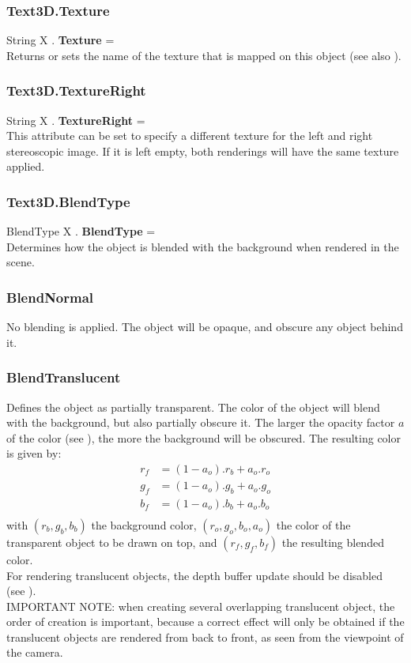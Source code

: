 \subsubsection{Text3D.Texture \label{F:Text3D:Texture}}
String X . \textbf{Texture} = \\
Returns or sets the name of the texture that is mapped on this object (see also ).

\subsubsection{Text3D.TextureRight \label{F:Text3D:TextureRight}}
String X . \textbf{TextureRight} = \\
This attribute can be set to specify a different texture for the left and right stereoscopic image. If it is left empty, both renderings will have the same texture applied.

\subsubsection{Text3D.BlendType \label{F:Text3D:BlendType}}
BlendType X . \textbf{BlendType} = \\
Determines how the object is blended with the background when rendered in the scene.

\subsubsection{BlendNormal \label{T:BlendType|BlendNormal}}
No blending is applied. The object will be opaque, and obscure any object behind it.

\subsubsection{BlendTranslucent \label{T:BlendType|BlendTranslucent}}
Defines the object as partially transparent. The color of the object will blend with the background, but also partially obscure it. The larger the opacity factor $a$ of the color (see ), the more the background will be obscured. The resulting color is given by:
\begin{equation}
\begin{array}{rcl}
r_f & = (1-a_o) . r_b + a_o . r_o \\
g_f & = (1-a_o) . g_b + a_o . g_o \\
b_f & = (1-a_o) . b_b + a_o . b_o \\
\end{array}
\end{equation}
with $(r_b,g_b,b_b)$ the background color, $(r_o,g_o,b_o,a_o)$ the color of the transparent object to be drawn on top, and $(r_f,g_f,b_f)$ the resulting blended color. \\
For rendering translucent objects, the depth buffer update should be disabled (see ). \\
IMPORTANT NOTE: when creating several overlapping translucent object, the order of creation is important, because a correct effect will only be obtained if the translucent objects are rendered from back to front, as seen from the viewpoint of the camera.

